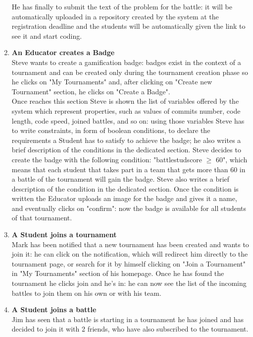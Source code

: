 \documentclass{article}
\begin{document}
\begin{enumerate}
\begin{itemize}
  \end{itemize}
  He has finally to submit the text of the problem for the battle: it will be automatically uploaded in a repository created by the system at the registration
  deadline and the students will be automatically given the link to see it and start coding.\\
  \newpage
  \item \textbf{An Educator creates a Badge\\}Steve wants to create a gamification badge: badges exist in the context of a tournament and can be created only during the tournament creation phase so he clicks on "My Tournaments" and, after clicking on "Create new Tournament" section, he clicks on "Create a Badge".\\
  Once reaches this section Steve is shown the list of variables offered by the system which represent properties, such as values of commits number, code length, code speed, joined battles, and so on: using those variables Steve has to write constraints, in form of boolean conditions, to declare the requirements a Student has to satisfy to achieve the badge; he also writes a brief description of the conditions in the dedicated section.
  Steve decides to create the badge with the following condition: "battle\textunderscore stud\textunderscore score $\geq$ 60", which means that each student that takes part in a team that gets more than 60 in a battle of the tournament will gain the badge.
  Steve also writes a brief description of the condition in the dedicated section.
  Once the condition is written the Educator uploads an image for the badge and gives it a name, and eventually clicks on "confirm": now the badge is available for all students of that tournament.\\
  \item \textbf{A Student joins a tournament\\} Mark has been notified that a new tournament has been created and wants to join it: he can click on the notification, which will redirect him directly to the tournament page, or search for it by himself clicking on "Join a Tournament" in "My Tournaments"
  section of his homepage. 
  Once he has found the tournament he clicks join and he's in: he can now see the list of the incoming battles to join them on his own or with his team.\\
  \item \textbf{A Student joins a battle\\} Jim has seen that a battle is starting in a tournament he has joined and has decided to join it with 2 friends, who have also subscribed to the tournament.\\

\end{enumerate}
\end{document}
